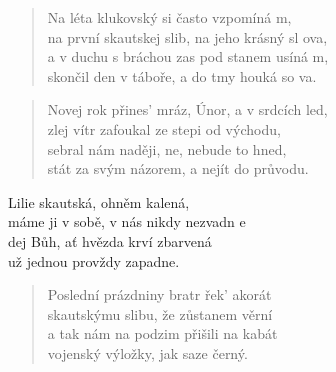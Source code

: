 \begin{song}{}
\begin{verse}
   Na léta klukovský si často vzpomíná m, \\
   na první skautskej slib, na jeho krásný sl ova, \\
   a v duchu s bráchou zas pod stanem usíná m, \\
   skončil den v táboře, a do tmy houká so va. 
\end{verse}
\begin{verse}
   Novej rok přines' mráz, Únor, a v srdcích led, \\
   zlej vítr zafoukal ze stepi od východu, \\
   sebral nám naději, ne, nebude to hned, \\
   stát za svým názorem, a nejít do průvodu.
\end{verse}
\begin{refren}
   Lilie skautská, ohněm kalená, \\
   máme ji v sobě, v nás nikdy nezvadn e \\
   dej Bůh, ať hvězda krví zbarvená \\
   už jednou provždy zapadne.
\end{refren}
\begin{verse}
   Poslední prázdniny bratr řek' akorát  \\
   skautskýmu slibu, že zůstanem věrní \\
   a tak nám na podzim přišili na kabát  \\
   vojenský výložky, jak saze černý. 
\end{verse}

\chordbreak
\compactbreak


\end{song}
